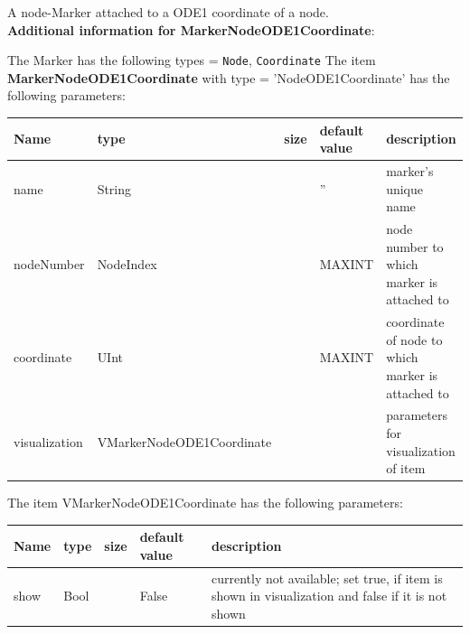 %
\newpage

\label{sec:item:MarkerNodeODE1Coordinate}
A node-Marker attached to a ODE1 coordinate of a node.\vspace{12pt}
 \\{\bf Additional information for MarkerNodeODE1Coordinate}:
\bi
  \item The Marker has the following types = \texttt{Node}, \texttt{Coordinate}
\ei
\vspace{12pt} \noindent The item {\bf MarkerNodeODE1Coordinate} with type = 'NodeODE1Coordinate' has the following parameters:\vspace{-1cm}\\ 
\begin{center}
  \footnotesize
  \begin{longtable}{| p{4.5cm} | p{2.5cm} | p{0.5cm} | p{2.5cm} | p{6cm} |}
    \hline
    \bf Name & \bf type & \bf size & \bf default value & \bf description \\ \hline
    name &     String &      &     '' &     marker's unique name\\ \hline
    nodeNumber &     NodeIndex &      &     MAXINT &     node number to which marker is attached to\\ \hline
    coordinate &     UInt &      &     MAXINT &     coordinate of node to which marker is attached to\\ \hline
    visualization & VMarkerNodeODE1Coordinate & & & parameters for visualization of item \\ \hline
	  \end{longtable}
	\end{center}
The item VMarkerNodeODE1Coordinate has the following parameters:\vspace{-1cm}\\ 
\begin{center}
  \footnotesize
  \begin{longtable}{| p{4.5cm} | p{2.5cm} | p{0.5cm} | p{2.5cm} | p{6cm} |}
    \hline
    \bf Name & \bf type & \bf size & \bf default value & \bf description \\ \hline
    show &     Bool &      &     False &     currently not available; set true, if item is shown in visualization and false if it is not shown\\ \hline
	  \end{longtable}
	\end{center}
\newpage

